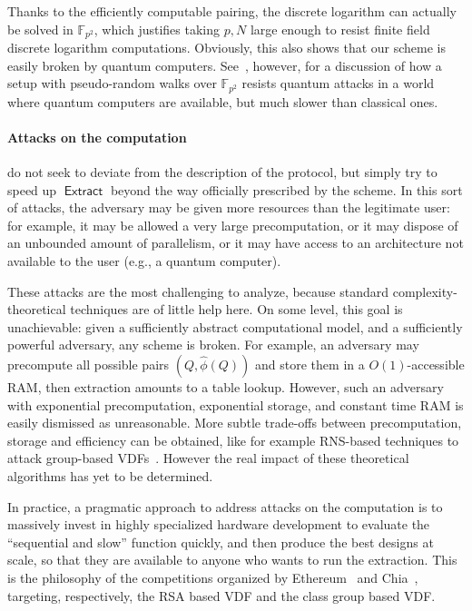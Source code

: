 \documentclass{llncs}
\newcommand{\F}{\mathbb{F}}
\DeclareMathOperator{\Extract}{\mathsf{Extract}}
\begin{document}
Thanks to the efficiently computable pairing, the discrete logarithm
can actually be solved in $\F_{p^2}$, which justifies taking $p,N$
large enough to resist finite field discrete logarithm computations. %
Obviously, this also shows that our scheme is easily broken by quantum
computers. %
See~\cite{10.1007/978-3-030-34578-5_10}, however, for a discussion of
how a setup with pseudo-random walks over $\F_{p^2}$ resists quantum
attacks in a world where quantum computers are available, but much
slower than classical ones.

\paragraph{Attacks on the computation} do not seek to deviate from the
description of the protocol, but simply try to speed up $\Extract$
beyond the way officially prescribed by the scheme. %
In this sort of attacks, the adversary may be given more resources
than the legitimate user: for example, it may be allowed a very large
precomputation, or it may dispose of an unbounded amount of
parallelism, or it may have access to an architecture not available to
the user (e.g., a quantum computer).

These attacks are the most challenging to analyze, because standard
com\-plexity-theoretical techniques are of little help here. %
On some level, this goal is unachievable: given a sufficiently
abstract computational model, and a sufficiently powerful adversary,
any scheme is broken. %
For example, an adversary may precompute all possible pairs
$(Q,\hat\phi(Q))$ and store them in a $O(1)$-accessible RAM, then
extraction amounts to a table lookup. %
However, such an adversary with exponential precomputation,
exponential storage, and constant time RAM is easily dismissed as
unreasonable. %
More subtle trade-offs between precomputation, storage and efficiency
can be obtained, like for example RNS-based techniques to attack
group-based VDFs~\cite{BernsteinSorenson07}. %
However the real impact
of these theoretical algorithms has yet to be determined.

In practice, a pragmatic approach to address attacks on the
computation is to massively invest in highly specialized hardware
development to evaluate the ``sequential and slow'' function quickly,
and then produce the best designs at scale, so that they are available
to anyone who wants to run the extraction. %
This is the philosophy of the competitions organized by
Ethereum~\cite{ethereum-vdf} and Chia~\cite{chia-vdf}, targeting,
respectively, the RSA based VDF and the class group based VDF.
\end{document}
